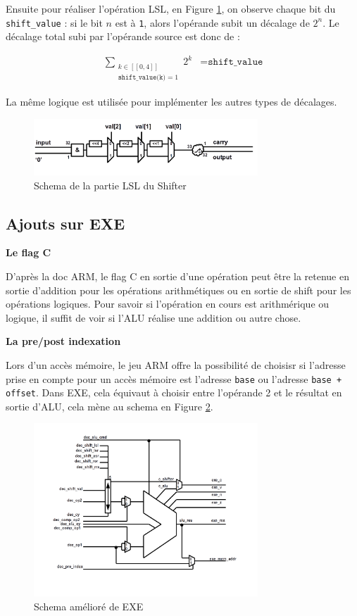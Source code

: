 \documentclass{article}
\begin{document}
Ensuite pour réaliser l'opération LSL, en Figure \ref{shifter_lsl},
on observe chaque bit du \texttt{shift\_value} :
si le bit $n$ est à \texttt{1}, alors l'opérande subit un décalage de $2^n$.
Le décalage total subi par l'opérande source est donc de :

\begin{eqnarray*}
  \sum_{\substack{k \in [[0, 4]] \\ \texttt{shift\_value(k)} = 1}} 2^k &= \texttt{shift\_value}
\end{eqnarray*}

La même logique est utilisée pour implémenter les autres types de décalages.

\begin{figure}[H]
\includegraphics[width=0.75\textwidth]{pics/shifter_lsl.png}
\centering
\caption{Schema de la partie LSL du Shifter}
\label{shifter_lsl}
\end{figure}



\subsection{Ajouts sur EXE}

\textbf{Le flag C}

D'après la doc ARM, le flag C en sortie d'une opération peut être la retenue en sortie d'addition
pour les opérations arithmétiques ou en sortie de shift pour les opérations logiques.
Pour savoir si l'opération en cours est arithmérique ou logique, il suffit de voir si
l'ALU réalise une addition ou autre chose.

\textbf{La pre/post indexation}

Lors d'un accès mémoire, le jeu ARM offre la possibilité de choisisr si l'adresse prise en compte
pour un accès mémoire est l'adresse \texttt{base} ou l'adresse \texttt{base + offset}.
Dans EXE, cela équivaut à choisir entre l'opérande 2 et le résultat en sortie d'ALU,
cela mène au schema en Figure \ref{exe}.

\begin{figure}[H]
\includegraphics[width=0.75\textwidth]{pics/exe.png}
\centering
\caption{Schema amélioré de EXE}
\label{exe}
\end{figure}
\end{document}
